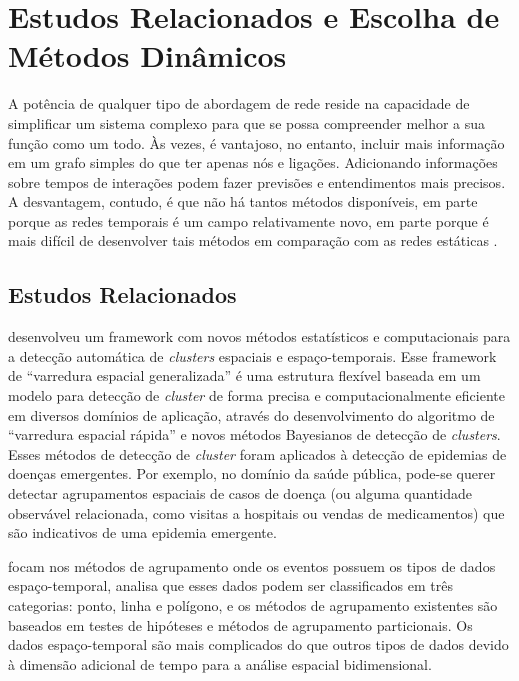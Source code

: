 \section{Estudos Relacionados e Escolha de Métodos Dinâmicos}
\label{sec:trabalhos-relacionados}

A potência de qualquer tipo de abordagem de rede reside na capacidade de simplificar um sistema complexo para que se possa compreender melhor a sua função como um todo. Às vezes, é vantajoso, no entanto, incluir mais informação em um grafo simples do que ter apenas nós e ligações. Adicionando informações sobre tempos de interações podem fazer previsões e entendimentos mais precisos. A desvantagem, contudo, é que não há tantos métodos disponíveis, em parte porque as redes temporais é um campo relativamente novo, em parte porque é mais difícil de desenvolver tais métodos em comparação com as redes estáticas \cite{holme:colloquium}.

\subsection{Estudos Relacionados}
\label{subsec:estudos}

 desenvolveu um framework com novos métodos estatísticos e computacionais para a detecção automática de \emph{clusters} espaciais e espaço-temporais. Esse framework de “varredura espacial generalizada” é uma estrutura flexível baseada em um modelo para detecção de \emph{cluster} de forma precisa e computacionalmente eficiente em diversos domínios de aplicação, através do desenvolvimento do algoritmo de “varredura espacial rápida” e novos métodos Bayesianos de detecção de \emph{clusters}. Esses métodos de detecção de \emph{cluster} foram aplicados à detecção de epidemias de doenças emergentes. Por exemplo, no domínio da saúde pública, pode-se querer detectar agrupamentos espaciais de casos de doença (ou alguma quantidade observável relacionada, como visitas a hospitais ou vendas de medicamentos) que são indicativos de uma epidemia emergente.

 focam nos métodos de agrupamento onde os eventos possuem os tipos de dados espaço-temporal, analisa que esses dados podem ser classificados em três categorias: ponto, linha e polígono, e os métodos de agrupamento existentes são baseados em testes de hipóteses e métodos de agrupamento particionais. Os dados espaço-temporal são mais complicados do que outros tipos de dados devido à dimensão adicional de tempo para a análise espacial bidimensional.

